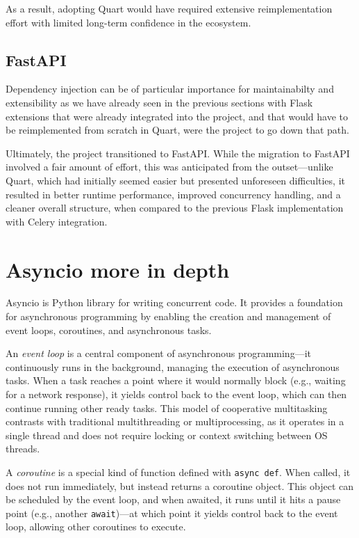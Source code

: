     As a result, adopting Quart would have required extensive reimplementation effort with limited long-term confidence in the 
    ecosystem.

  \subsection{FastAPI}
    Dependency injection can be of particular importance for maintainabilty and extensibility as we have already seen in the previous 
    sections with Flask extensions that were already integrated into the project, and that would have to be reimplemented from scratch 
    in Quart, were the project to go down that path. 
    
    Ultimately, the project transitioned to FastAPI. While the migration to FastAPI involved a fair amount of effort, this 
    was anticipated from the outset—unlike Quart, which had initially seemed easier but presented unforeseen difficulties, 
    it resulted in better runtime performance, improved concurrency handling, and a cleaner overall structure, when compared 
    to the previous Flask implementation with Celery integration.


\section{Asyncio more in depth}

  Asyncio is Python library for writing concurrent code. It provides a foundation for asynchronous programming by enabling 
  the creation and management of event loops, coroutines, and asynchronous tasks.

  An \textit{event loop} is a central component of asynchronous programming—it continuously runs in the background, managing 
  the execution of asynchronous tasks. When a task reaches a point where it would normally block (e.g., waiting for a network 
  response), it yields control back to the event loop, which can then continue running other ready tasks. This model of 
  cooperative multitasking contrasts with traditional multithreading or multiprocessing, as it operates in a single thread 
  and does not require locking or context switching between OS threads.

  A \textit{coroutine} is a special kind of function defined with \texttt{async def}. When called, it does not run immediately, 
  but instead returns a coroutine object. This object can be scheduled by the event loop, and when awaited, it runs until it 
  hits a pause point (e.g., another \texttt{await})—at which point it yields control back to the event loop, allowing other 
  coroutines to execute.

